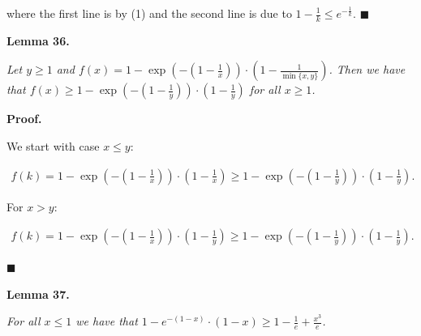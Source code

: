 \documentclass[10pt,a4paper]{article}
\begin{document}
where the first line is by (1) and the second line is due to $1-\frac{1}{k}\leq e^{-\frac{1}{k}}$.
\ensuremath{\blacksquare}\par






\par\medskip\noindent\textbf{\textbf{Lemma 36}\textbf{.}}\par



\emph{Let $y\geq 1$ and $f(x)=1-\exp\left(-\left(1-\frac{1}{x}\right)\right)\cdot\left(1-\frac{1}{\min\{x,y\}}\right)$.
Then we have that
$f(x)\geq 1-\exp\left(-\left(1-\frac{1}{y}\right)\right)\cdot\left(1-\frac{1}{y}\right)$ for all $x\geq 1$.}\par






\par\medskip\noindent\textbf{Proof.}\par



We start with case $x\leq y$:\par


\[\begin{gathered}
\displaystyle f(k)=1-\exp\left(-\left(1-\frac{1}{x}\right)\right)\cdot\left(1-\frac{1}{x}\right)\geq 1-\exp\left(-\left(1-\frac{1}{y}\right)\right)\cdot\left(1-\frac{1}{y}\right).
\end{gathered}\]


For $x>y$:\par


\[\begin{gathered}
\displaystyle f(k)=1-\exp\left(-\left(1-\frac{1}{x}\right)\right)\cdot\left(1-\frac{1}{y}\right)\geq 1-\exp\left(-\left(1-\frac{1}{y}\right)\right)\cdot\left(1-\frac{1}{y}\right).
\end{gathered}\]


\ensuremath{\blacksquare}\par






\par\medskip\noindent\textbf{\textbf{Lemma 37}\textbf{.}}\par



\emph{For all $x\leq 1$ we have that $1-e^{-(1-x)}\cdot(1-x)\geq 1-\frac{1}{e}+\frac{x^{3}}{e}$.}\par
\end{document}
